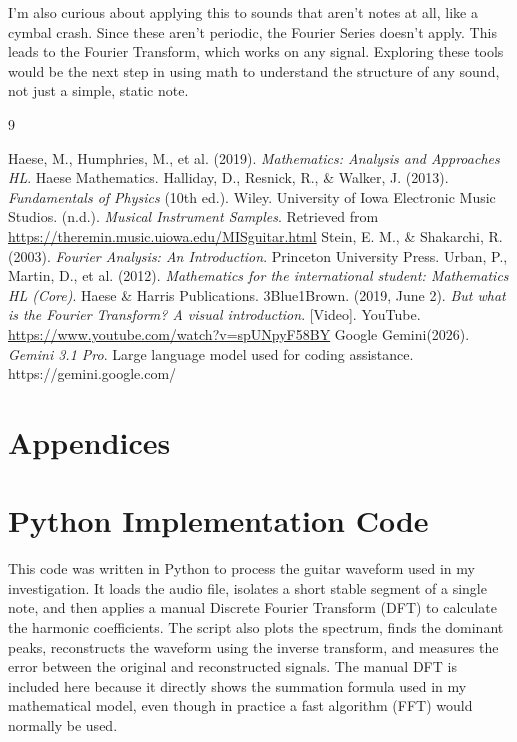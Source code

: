 \documentclass{article}
\begin{document}
I’m also curious about applying this to sounds that aren’t notes at all, like a cymbal crash. Since these aren't periodic, the Fourier Series doesn't apply. This leads to the Fourier Transform, which works on any signal. Exploring these tools would be the next step in using math to understand the structure of any sound, not just a simple, static note.
\newpage
\begin{thebibliography}{9}

 Haese, M., Humphries, M., et al. (2019). \textit{Mathematics: Analysis and Approaches HL}. Haese Mathematics.
 Halliday, D., Resnick, R., \& Walker, J. (2013). \textit{Fundamentals of Physics} (10th ed.). Wiley.
 University of Iowa Electronic Music Studios. (n.d.). \textit{Musical Instrument Samples}. Retrieved from \url{https://theremin.music.uiowa.edu/MISguitar.html}
 Stein, E. M., \& Shakarchi, R. (2003). \textit{Fourier Analysis: An Introduction}. Princeton University Press.
 Urban, P., Martin, D., et al. (2012). \textit{Mathematics for the international student: Mathematics HL (Core)}. Haese \& Harris Publications.
 3Blue1Brown. (2019, June 2). \textit{But what is the Fourier Transform? A visual introduction}. [Video]. YouTube. \url{https://www.youtube.com/watch?v=spUNpyF58BY}
 Google Gemini(2026). \textit{Gemini 3.1 Pro}. Large language model used for coding assistance. https://gemini.google.com/

\end{thebibliography}

\newpage
\section*{Appendices}
\appendix
\section{Python Implementation Code}
This code was written in Python to process the guitar waveform used in my investigation. It loads the audio file, isolates a short stable segment of a single note, and then applies a manual Discrete Fourier Transform (DFT) to calculate the harmonic coefficients. The script also plots the spectrum, finds the dominant peaks, reconstructs the waveform using the inverse transform, and measures the error between the original and reconstructed signals. The manual DFT is included here because it directly shows the summation formula used in my mathematical model, even though in practice a fast algorithm (FFT) would normally be used.
\end{document}
